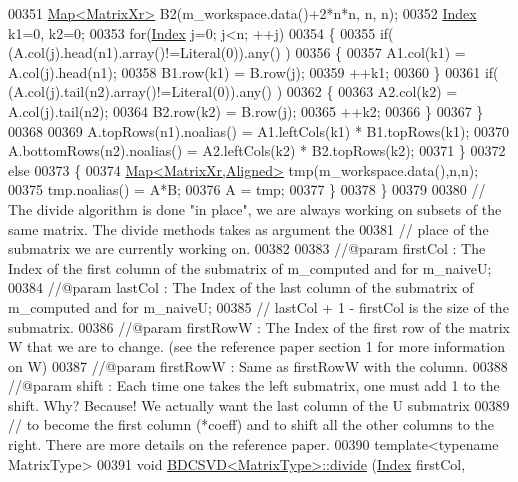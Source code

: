 \begin{DoxyCode}
00351     \hyperlink{group___core___module_class_eigen_1_1_map}{Map<MatrixXr>} B2(m\_workspace.data()+2*n*n, n,  n);
00352     \hyperlink{namespace_eigen_a62e77e0933482dafde8fe197d9a2cfde}{Index} k1=0, k2=0;
00353     \textcolor{keywordflow}{for}(\hyperlink{namespace_eigen_a62e77e0933482dafde8fe197d9a2cfde}{Index} j=0; j<n; ++j)
00354     \{
00355       \textcolor{keywordflow}{if}( (A.col(j).head(n1).array()!=Literal(0)).any() )
00356       \{
00357         A1.col(k1) = A.col(j).head(n1);
00358         B1.row(k1) = B.row(j);
00359         ++k1;
00360       \}
00361       \textcolor{keywordflow}{if}( (A.col(j).tail(n2).array()!=Literal(0)).any() )
00362       \{
00363         A2.col(k2) = A.col(j).tail(n2);
00364         B2.row(k2) = B.row(j);
00365         ++k2;
00366       \}
00367     \}
00368   
00369     A.topRows(n1).noalias()    = A1.leftCols(k1) * B1.topRows(k1);
00370     A.bottomRows(n2).noalias() = A2.leftCols(k2) * B2.topRows(k2);
00371   \}
00372   \textcolor{keywordflow}{else}
00373   \{
00374     \hyperlink{group___core___module_class_eigen_1_1_map}{Map<MatrixXr,Aligned>} tmp(m\_workspace.data(),n,n);
00375     tmp.noalias() = A*B;
00376     A = tmp;
00377   \}
00378 \}
00379 
00380 \textcolor{comment}{// The divide algorithm is done "in place", we are always working on subsets of the same matrix. The divide
       methods takes as argument the }
00381 \textcolor{comment}{// place of the submatrix we are currently working on.}
00382 
00383 \textcolor{comment}{//@param firstCol : The Index of the first column of the submatrix of m\_computed and for m\_naiveU;}
00384 \textcolor{comment}{//@param lastCol : The Index of the last column of the submatrix of m\_computed and for m\_naiveU; }
00385 \textcolor{comment}{// lastCol + 1 - firstCol is the size of the submatrix.}
00386 \textcolor{comment}{//@param firstRowW : The Index of the first row of the matrix W that we are to change. (see the reference
       paper section 1 for more information on W)}
00387 \textcolor{comment}{//@param firstRowW : Same as firstRowW with the column.}
00388 \textcolor{comment}{//@param shift : Each time one takes the left submatrix, one must add 1 to the shift. Why? Because! We
       actually want the last column of the U submatrix }
00389 \textcolor{comment}{// to become the first column (*coeff) and to shift all the other columns to the right. There are more
       details on the reference paper.}
00390 \textcolor{keyword}{template}<\textcolor{keyword}{typename} MatrixType>
00391 \textcolor{keywordtype}{void} \hyperlink{group___s_v_d___module_class_eigen_1_1_b_d_c_s_v_d}{BDCSVD<MatrixType>::divide} (\hyperlink{namespace_eigen_a62e77e0933482dafde8fe197d9a2cfde}{Index} firstCol, 

\end{DoxyCode}

